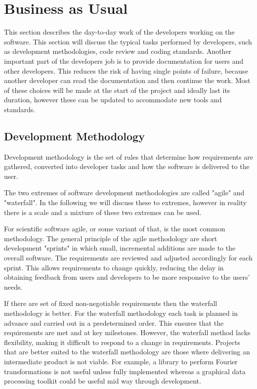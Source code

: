 \documentclass[jnr]{iosart2x}
\begin{document}
\section{Business as Usual}
\label{Business as Usual}

This section describes the day-to-day work of the developers working on the software.
This section will discuss the typical tasks performed by developers, such as development methodologies, code review and coding standards.
Another important part of the developers job is to provide documentation for users and other developers.
This reduces the risk of having single points of failure, because another developer can read the documentation and then continue the work.
Most of these choices will be made at the start of the project and ideally last its duration, however these can be updated to accommodate new tools and standards.

\subsection{Development Methodology}
\label{Development methodology}

Development methodology is the set of rules that determine how requirements are gathered, converted into developer tasks and how the software is delivered to the user.

The two extremes of software development methodologies are called "agile" and "waterfall".
In the following we will discuss these to extremes, however in reality there is a scale and a mixture of these two extremes can be used.

For scientific software agile, or some variant of that, is the most common methodology.
The general principle of the agile methodology are short development "sprints" in which small, incremental additions are made to the overall software.
The requirements are reviewed and adjusted accordingly for each sprint.
This allows requirements to change quickly, reducing the delay in obtaining feedback from users and developers to be more responsive to the users' needs.

If there are set of fixed non-negotiable requirements then the waterfall methodology is better.
For the waterfall methodology each task is planned in advance and carried out in a predetermined order.
This ensures that the requirements are met and at key milestones.
However, the waterfall method lacks flexibility, making it difficult to respond to a change in requirements.
Projects that are better suited to the waterfall methodology are those where delivering an intermediate product is not viable.
For example, a library to perform Fourier transformations is not useful unless fully implemented whereas a graphical data processing toolkit could be useful mid way through development.
\end{document}
